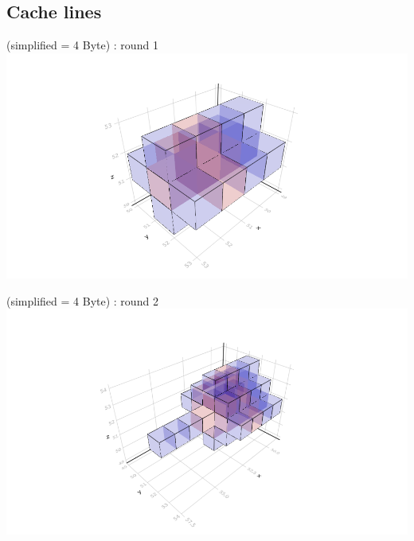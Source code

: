 \documentclass{beamer}
\begin{document}
\subsection{Cache lines}
\begin{frame}{\insertsubsection (simplified = 4 Byte) : round 1}
  \centering\includegraphics[trim=5cm 0.7cm 5cm 3cm, clip, width=1\linewidth]{algorithm_visualisation/srgcache4/srgcache_step0.png}\\
\end{frame}
\begin{frame}{\insertsubsection (simplified = 4 Byte) : round 2}
  \centering\includegraphics[trim=5cm 0.7cm 5cm 3cm, clip, width=1\linewidth]{algorithm_visualisation/srgcache4/srgcache_step1.png}\\
\end{frame}
\end{document}
